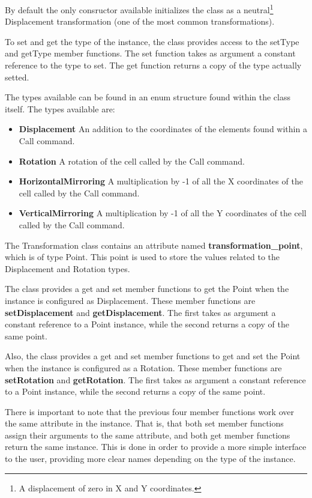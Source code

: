 \documentclass[11pt,twoside,openany,x11names,svgnames]{memoir}
\begin{document}
By default the only consructor available initializes the class as a neutral\footnote{A displacement of zero in X and Y coordinates.} Displacement transformation (one of the most common transformations).

To set and get the type of the instance, the class provides access to the setType and getType member functions. The set function takes as argument a constant reference to the type to set. The get function returns a copy of the type actually setted. 

The types available can be found in an enum structure found within the class itself. The types available are:

\begin{itemize}
\item \textbf{Displacement} An addition to the coordinates of the elements found within a Call command.
\item \textbf{Rotation} A rotation of the cell called by the Call command.
\item \textbf{HorizontalMirroring} A multiplication by -1 of all the X coordinates of the cell called by the Call command.
\item \textbf{VerticalMirroring} A multiplication by -1 of all the Y coordinates of the cell called by the Call command.
\end{itemize}

The Transformation class contains an attribute named \textbf{transformation\_point}, which is of type Point. This point is used to store the values related to the Displacement and Rotation types. 

The class provides a get and set member functions to get the Point when the instance is configured as Displacement. These member functions are \textbf{setDisplacement} and \textbf{getDisplacement}. The first takes as argument a constant reference to a Point instance, while the second returns a copy of the same point.

Also, the class provides a get and set member functions to get and set the Point when the instance is configured as a Rotation. These member functions are \textbf{setRotation} and \textbf{getRotation}. The first takes as argument a constant reference to a Point instance, while the second returns a copy of the same point.

There is important to note that the previous four member functions work over the same attribute in the instance. That is, that both set member functions assign their arguments to the same attribute, and both get member functions return the same instance. This is done in order to provide a more simple interface to the user, providing more clear names depending on the type of the instance.
\end{document}
